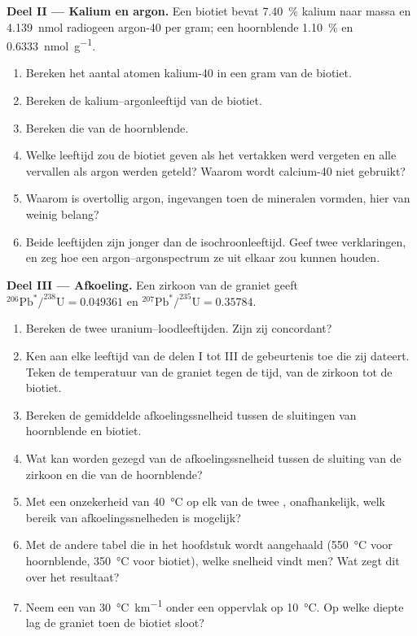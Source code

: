 \begin{problem}
\noindent\textbf{Deel II --- Kalium en argon.} Een biotiet bevat \qty{7.40}{\percent} kalium naar massa en \qty{4.139}{nmol} radiogeen argon-40 per gram; een hoornblende \qty{1.10}{\percent} en \qty{0.6333}{nmol.g^{-1}}.
\begin{enumerate}[resume]
  \item Bereken het aantal atomen kalium-40 in een gram van de biotiet.
  \item Bereken de kalium--argonleeftijd van de biotiet.
  \item Bereken die van de hoornblende.
  \item Welke leeftijd zou de biotiet geven als het vertakken werd vergeten en alle vervallen als argon werden geteld? Waarom wordt calcium-40 niet gebruikt?
  \item Waarom is overtollig argon, ingevangen toen de mineralen vormden, hier van weinig belang?
  \item Beide leeftijden zijn jonger dan de isochroonleeftijd. Geef twee verklaringen, en zeg hoe een argon--argonspectrum ze uit elkaar zou kunnen houden.
\end{enumerate}

\noindent\textbf{Deel III --- Afkoeling.} Een zirkoon van de graniet geeft $^{206}\mathrm{Pb}^*/^{238}\mathrm{U} = 0.049361$ en
$^{207}\mathrm{Pb}^*/^{235}\mathrm{U} = 0.35784$.
\begin{enumerate}[resume]
  \item Bereken de twee uranium--loodleeftijden. Zijn zij concordant?
  \item Ken aan elke leeftijd van de delen I tot III de gebeurtenis toe die zij dateert. Teken de temperatuur van de graniet tegen de tijd, van de zirkoon tot de biotiet.
  \item Bereken de gemiddelde afkoelingssnelheid tussen de sluitingen van hoornblende en biotiet.
  \item Wat kan worden gezegd van de afkoelingssnelheid tussen de sluiting van de zirkoon en die van de hoornblende?
  \item Met een onzekerheid van \qty{40}{\celsius} op elk van de twee , onafhankelijk, welk bereik van afkoelingssnelheden is mogelijk?
  \item Met de andere tabel die in het hoofdstuk wordt aangehaald (\qty{550}{\celsius} voor hoornblende, \qty{350}{\celsius} voor biotiet), welke snelheid vindt men? Wat zegt dit over het resultaat?
  \item Neem een  van \qty{30}{\celsius.km^{-1}} onder een oppervlak op \qty{10}{\celsius}. Op welke diepte lag de graniet toen de biotiet sloot?
\end{enumerate}


\end{problem}
